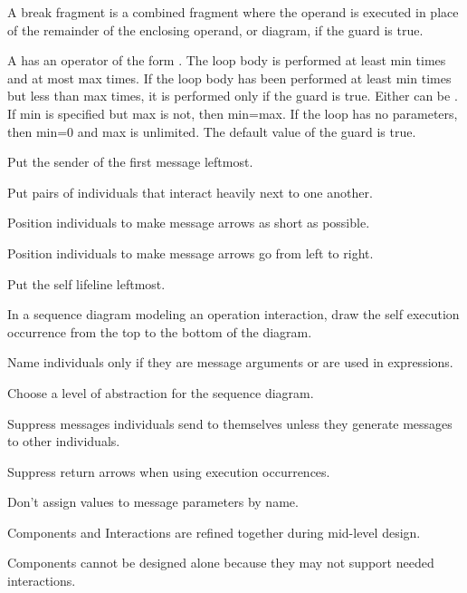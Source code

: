 \begin{compactitem}
\begin{compactitem}
\begin{compactitem}
\item A break fragment is a combined fragment where the operand is executed in place of the remainder of the enclosing operand, or diagram, if the guard is true. 
\item A  has an operator of the form . The loop body is performed at least min times and at most max times. If the loop body has been performed at least min times but less than max times, it is performed only if the guard is true. Either can be \e{*}. If min is specified but max is not, then min=max. If the loop has no parameters, then min=0 and max is unlimited. The default value of the guard is true.
\item {}
\begin{compactitem}
\item Put the sender of the ﬁrst message leftmost.
\item Put pairs of individuals that interact heavily next to one another.
\item Position individuals to make message arrows as short as possible.
\item Position individuals to make message arrows go from left to right.
\item Put the self lifeline leftmost.
\item In a sequence diagram modeling an operation interaction, draw the self execution occurrence from the top to the bottom of the diagram.
\item Name individuals only if they are message arguments or are used in expressions.
\item Choose a level of abstraction for the sequence diagram.
\item Suppress messages individuals send to themselves unless they generate messages to other individuals.
\item Suppress return arrows when using execution occurrences.
\item Don’t assign values to message parameters by name. 
\end{compactitem}
\end{compactitem}
\item {}
\begin{compactitem}
\item Components and Interactions are refined together during mid-level design.
\item Components cannot be designed alone because they may not support needed interactions.

\end{compactitem}
\end{compactitem}
\end{compactitem}
